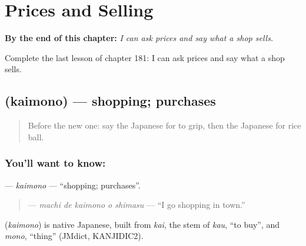 
\chapter{Prices and Selling}
\label{ch:ja-prices-and-selling}

\begin{chapteropening}
\textbf{By the end of this chapter:} \emph{I can ask prices and say what a shop sells.}

Complete the last lesson of chapter 181: I can ask prices and say what a shop sells.
\end{chapteropening}

\section[\texorpdfstring{\ja{かいもの} (kaimono)}{かいもの (kaimono)}]{ (kaimono) — shopping; purchases}

\label{lesson:JA-C181-kaimono}



\begin{quote}
Before the new one: say the Japanese for to grip, then the Japanese for rice ball.
\end{quote}

\subsection*{You'll want to know: }
\textbf{} — \emph{kaimono} — \textquotedblleft{}shopping; purchases\textquotedblright{}.

\begin{quote}
\textbf{  } — \emph{machi de kaimono o shimasu} — \textquotedblleft{}I go shopping in town.\textquotedblright{}
\end{quote}

\begin{cousinweb}
\textbf{} (\emph{kaimono}) is native Japanese, built from \emph{kai}, the stem of \emph{kau}, \textquotedblleft{}to buy\textquotedblright{}, and \emph{mono}, \textquotedblleft{}thing\textquotedblright{} (JMdict, KANJIDIC2).
\end{cousinweb}

